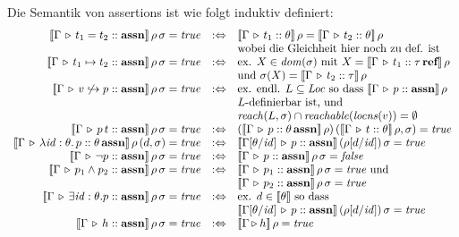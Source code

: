 \documentclass[12pt,a4paper,bigheadings]{scrartcl}
\newcommand{\semantic}[1]{\ensuremath{\llbracket#1\rrbracket}}
\newcommand{\assn}{\ensuremath{\mathbf{assn}}}
\newcommand{\atype}[1]{#1\,\assn}
\newcommand{\locns}{\name{locns}}
\renewcommand{\disjoint}[2]{\ensuremath{#2\not\hookrightarrow#1}}
\begin{document}
\pagebreak[3] \noindent
Die Semantik von assertions ist wie folgt induktiv definiert:
\[\begin{array}{rcl}
  \semantic{\Tj{\Gamma}{t_1 = t_2}{\assn}}\,\rho\,\sigma = \true
  & :\Leftrightarrow &
  \semantic{\Tj{\Gamma}{t_1}{\theta}}\,\rho = \semantic{\Tj{\Gamma}{t_2}{\theta}}\,\rho \\
  && \text{wobei die Gleichheit hier noch zu def. ist}
  \\
  \semantic{\Tj{\Gamma}{t_1\mapsto t_2}{\assn}}\,\rho\,\sigma = \true
  & :\Leftrightarrow &
  \text{ex. } X\in\dom{\sigma} \text{ mit } X = \semantic{\Tj{\Gamma}{t_1}{\reftype{\tau}}}\,\rho \\
  && \text{und } \sigma(X) = \semantic{\Tj{\Gamma}{t_2}{\tau}}\,\rho
  \\
  \semantic{\Tj{\Gamma}{\disjoint{p}{v}}{\assn}}\,\rho\,\sigma = \true
  & :\Leftrightarrow &
  \text{ex. endl. } L \subseteq \Loc \text{ so dass } \semantic{\Tj{\Gamma}{p}{\assn}}\,\rho \\
  && \text{$L$-definierbar ist, und } \\
  && \name{reach}(L,\sigma) \cap \name{reachable}(\locns(v))=\emptyset
  \\
  \semantic{\Tj{\Gamma}{\app{p}{t}}{\assn}}\,\rho\,\sigma = \true
  & :\Leftrightarrow &
  (\semantic{\Tj{\Gamma}{p}{\atype{\theta}}}\,\rho)\,(\semantic{\Tj{\Gamma}{t}{\theta}}\,\rho,\sigma)=\true
  \\
  \semantic{\Tj{\Gamma}{\abstr{\id:\theta}{p}}{\atype{\theta}}}\,\rho\,(d,\sigma) = \true
  & :\Leftrightarrow &
  \semantic{\Tj{\Gamma[\theta/\id]}{p}{\assn}}\,(\rho[d/\id])\,\sigma = \true
  \\
  \semantic{\Tj{\Gamma}{\neg p}{\assn}}\,\rho\,\sigma = \true
  & :\Leftrightarrow &
  \semantic{\Tj{\Gamma}{p}{\assn}}\,\rho\,\sigma = \false
  \\
  \semantic{\Tj{\Gamma}{p_1 \wedge p_2}{\assn}}\,\rho\,\sigma = \true
  & :\Leftrightarrow &
  \semantic{\Tj{\Gamma}{p_1}{\assn}}\,\rho\,\sigma = \true \text{ und } \\
  && \semantic{\Tj{\Gamma}{p_2}{\assn}}\,\rho\,\sigma = \true
  \\
  \semantic{\Tj{\Gamma}{\exists \id:\theta.p}{\assn}}\,\rho\,\sigma = \true
  & :\Leftrightarrow &
  \text{ex. } d\in\semantic{\theta} \text{ so dass } \\
  && \semantic{\Tj{\Gamma[\theta/\id]}{p}{\assn}}\,(\rho[d/\id])\,\sigma = \true
  \\
  \semantic{\Tj{\Gamma}{h}{\assn}}\,\rho\,\sigma = \true
  & :\Leftrightarrow &
  \semantic{\Tjh{\Gamma}{h}}\,\rho = \true
\end{array}\]
\end{document}
